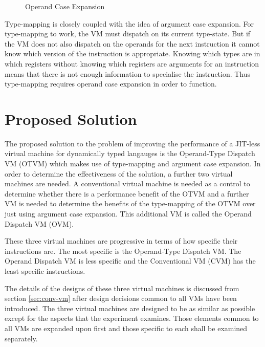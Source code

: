 \documentclass[english,a4paper,12pt]{report}
\begin{document}
\begin{figure}[!htb]
	\centering
	\caption{Operand Case Expansion}
	\label{fig:op-case-expansion}
	
\end{figure}

Type-mapping is closely coupled with the idea of argument case
expansion. For type-mapping to work, the VM must dispatch on its
current type-state. But if the VM does not also dispatch on the
operands for the next instruction it cannot know which version of the
instruction is appropriate. Knowing which types are in which registers
without knowing which registers are arguments for an instruction means
that there is not enough information to specialise the
instruction. Thus type-mapping requires operand case expansion in
order to function.

\section{Proposed Solution}
The proposed solution to the problem of improving the performance of a
JIT-less virtual machine for dynamically typed langauges is the
Operand-Type Dispatch VM (OTVM) which makes use of type-mapping and
argument case expansion. In order to determine the effectiveness of
the solution, a further two virtual machines are needed. A
conventional virtual machine is needed as a control to determine
whether there is a performance benefit of the OTVM and a further VM is
needed to determine the benefits of the type-mapping of the OTVM over
just using argument case expansion. This additional VM is called the
Operand Dispatch VM (OVM).

These three virtual machines are progressive in terms of how specific
their instructions are. The most specific is the Operand-Type Dispatch
VM.  The Operand Dispatch VM is less specific and the Conventional VM
(CVM) has the least specific instructions.

The details of the designs of these three virtual machines is
discussed from section \ref{sec:conv-vm} after design decisions common
to all VMs have been introduced. The three virtual machines are
designed to be as similar as possible except for the aspects that the
experiment examines. Those elements common to all VMs are expanded
upon first and those specific to each shall be examined separately.
\end{document}
